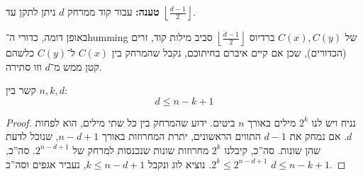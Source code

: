 \documentclass[]{article}
\newcommand\rf    {\right\rfloor}
\newcommand\lf    {\left\lfloor}
\begin{document}
	\textbf{טענה: }עבור קוד ממרחק $d$ ניתן לתקן עד $\lf\frac{d - 1}{2}\rf$. 
	
	באופן דומה, כדורי ה־humming של $C(x), C(y)$ ברדיוס $\lf\frac{d - 1}{2}\rf$ סביב מילות קוד, זרים (הכדורים), שכן אם קיים איברם בחיתוכם, נקבל שהמרחק בין $C(x)$ ל־$C(y)$ כלשהם קטן ממש מ־$d$ וזו סתירה. 
	
	קשר בין $n, k, d$: 
	\[ d \le n - k + 1 \]
	
	\begin{proof}
		נניח ויש לנו $2^{k}$ מילים באורך $n$ ביטים. ידוע שהמרחק בין כל שתי מילים, הוא לפחות $d$. אם נמחק את $d - 1 $ התווים הראשונים, יתרת המחרוזות באורך $n - d + 1 $, שנוכל לדעת שהן שונות. סה''כ, קיבלנו $2^{k }$ מחרוזות שונות שנכנסות למרחק של $2^{n - d + 1}$. סה''כ, $2^{k} \le 2^{n - d + 1 }$. נוציא לוג ונקבל $k \le n - d + 1$, נעביר אגפים וסה''כ $d \le n - k + 1$. 
	\end{proof}
	
\end{document}
